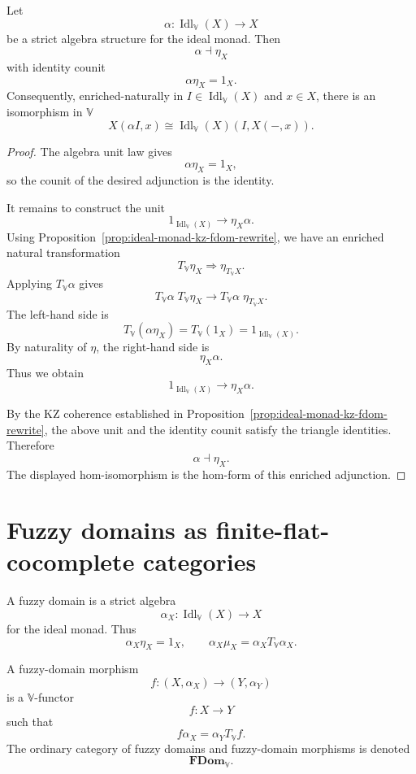 \begin{theorem}
\label{thm:algebra-map-left-adjoint-y-fdom-rewrite}
Let
\[
    \alpha:\operatorname{Idl}_{\mathbb V}(X)\to X
\]
be a strict algebra structure for the ideal monad.  Then
\[
    \alpha\dashv\eta_X
\]
with identity counit
\[
    \alpha\eta_X=1_X.
\]
Consequently, enriched-naturally in
\(I\in\operatorname{Idl}_{\mathbb V}(X)\) and \(x\in X\), there is an
isomorphism in \(\mathbb V\)
\[
    X(\alpha I,x)
    \cong
    \operatorname{Idl}_{\mathbb V}(X)(I,X(-,x)).
\]
\end{theorem}

\begin{proof}
The algebra unit law gives
\[
    \alpha\eta_X=1_X,
\]
so the counit of the desired adjunction is the identity.

It remains to construct the unit
\[
    1_{\operatorname{Idl}_{\mathbb V}(X)}
    \longrightarrow
    \eta_X\alpha.
\]
Using Proposition~\ref{prop:ideal-monad-kz-fdom-rewrite}, we have an enriched
natural transformation
\[
    T_{\mathbb V}\eta_X
    \Longrightarrow
    \eta_{T_{\mathbb V}X}.
\]
Applying \(T_{\mathbb V}\alpha\) gives
\[
    T_{\mathbb V}\alpha\;T_{\mathbb V}\eta_X
    \longrightarrow
    T_{\mathbb V}\alpha\;\eta_{T_{\mathbb V}X}.
\]
The left-hand side is
\[
    T_{\mathbb V}(\alpha\eta_X)
    =
    T_{\mathbb V}(1_X)
    =
    1_{\operatorname{Idl}_{\mathbb V}(X)}.
\]
By naturality of \(\eta\), the right-hand side is
\[
    \eta_X\alpha.
\]
Thus we obtain
\[
    1_{\operatorname{Idl}_{\mathbb V}(X)}
    \longrightarrow
    \eta_X\alpha.
\]

By the KZ coherence established in
Proposition~\ref{prop:ideal-monad-kz-fdom-rewrite}, the above unit and the
identity counit satisfy the triangle identities.  Therefore
\[
    \alpha\dashv\eta_X.
\]
The displayed hom-isomorphism is the hom-form of this enriched adjunction.
\end{proof}

\section{Fuzzy domains as finite-flat-cocomplete categories}
\label{sec:fuzzy-domains-as-ff-cocomplete-rewrite}

\begin{definition}
\label{def:fuzzy-domain-category-rewrite}
A fuzzy domain is a strict algebra
\[
    \alpha_X:
    \operatorname{Idl}_{\mathbb V}(X)\to X
\]
for the ideal monad.  Thus
\[
    \alpha_X\eta_X=1_X,
    \qquad
    \alpha_X\mu_X
    =
    \alpha_XT_{\mathbb V}\alpha_X.
\]

A fuzzy-domain morphism
\[
    f:(X,\alpha_X)\to(Y,\alpha_Y)
\]
is a \(\mathbb V\)-functor
\[
    f:X\to Y
\]
such that
\[
    f\alpha_X
    =
    \alpha_YT_{\mathbb V}f.
\]
The ordinary category of fuzzy domains and fuzzy-domain morphisms is denoted
\[
    \mathbf{FDom}_{\mathbb V}.
\]
\end{definition}


